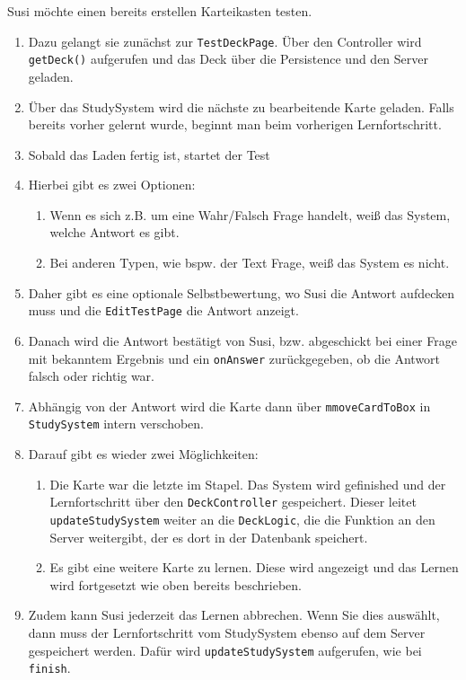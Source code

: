 \documentclass[fontsize=12pt,paper=A4,twoside]{scrartcl}
\begin{document}
    Susi möchte einen bereits erstellen Karteikasten testen.\\
    \begin{enumerate}
    \item Dazu gelangt sie zunächst zur \texttt{TestDeckPage}. Über den Controller wird \texttt{getDeck()} aufgerufen und das Deck über die Persistence und den Server geladen.
    \item Über das StudySystem wird die nächste zu bearbeitende Karte geladen. Falls bereits vorher gelernt wurde, beginnt man beim vorherigen Lernfortschritt.
    \item Sobald das Laden fertig ist, startet der Test
    \item Hierbei gibt es zwei Optionen:
        \begin {enumerate}
        \item  Wenn es sich z.B. um eine Wahr/Falsch Frage handelt, weiß das System, welche Antwort es gibt. 
        \item Bei anderen Typen, wie bspw. der Text Frage, weiß das System es nicht. 
        \end {enumerate}
     \item Daher gibt es eine optionale Selbstbewertung, wo Susi die Antwort aufdecken muss und die \texttt{EditTestPage} die Antwort anzeigt.
     \item Danach wird die Antwort bestätigt von Susi, bzw. abgeschickt bei einer Frage mit bekanntem Ergebnis und ein \texttt{onAnswer} zurückgegeben, ob die Antwort falsch 
    oder richtig war.
    \item Abhängig von der Antwort wird die Karte dann über \texttt{mmoveCardToBox} in \texttt{StudySystem} intern verschoben.
    \item Darauf gibt es wieder zwei Möglichkeiten: 
        \begin {enumerate}
        \item Die Karte war die letzte im Stapel. Das System wird gefinished und der Lernfortschritt über den \texttt{DeckController} gespeichert. Dieser leitet 
        \texttt{updateStudySystem} weiter an die \texttt{DeckLogic}, die die Funktion an den Server weitergibt, der es dort in der Datenbank speichert.
        \item Es gibt eine weitere Karte zu lernen. Diese wird angezeigt und das Lernen wird fortgesetzt wie oben bereits beschrieben.   
        \end {enumerate}
    \item Zudem kann Susi jederzeit das Lernen abbrechen. Wenn Sie dies auswählt, dann muss der Lernfortschritt vom StudySystem ebenso auf dem Server gespeichert werden. Dafür wird 
     \texttt{updateStudySystem} aufgerufen, wie bei \texttt{finish}.
    \end{enumerate}
\end{document}
